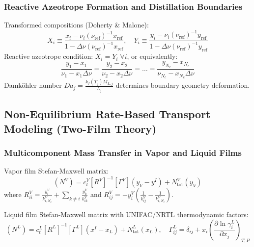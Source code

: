 \documentclass[11pt,a4paper]{article}
\begin{document}
\subsubsection{Reactive Azeotrope Formation and Distillation Boundaries}
Transformed compositions (Doherty \& Malone):
\begin{equation}
X_i \equiv \frac{x_i - \nu_i (\nu_{\text{ref}})^{-1} x_{\text{ref}}}{1 - \Delta \nu (\nu_{\text{ref}})^{-1} x_{\text{ref}}}, \quad Y_i \equiv \frac{y_i - \nu_i (\nu_{\text{ref}})^{-1} y_{\text{ref}}}{1 - \Delta \nu (\nu_{\text{ref}})^{-1} y_{\text{ref}}}
\end{equation}
Reactive azeotrope condition: $X_i = Y_i \; \forall i$, or equivalently:
\begin{equation}
\frac{y_1 - x_1}{\nu_1 - x_1 \Delta \nu} = \frac{y_2 - x_2}{\nu_2 - x_2 \Delta \nu} = \dots = \frac{y_{N_c} - x_{N_c}}{\nu_{N_c} - x_{N_c} \Delta \nu}
\end{equation}
Damk\"ohler number $Da_j = \frac{k_f(T_j) M_{L,j}}{L_j}$ determines boundary geometry deformation.

\subsection{Non-Equilibrium Rate-Based Transport Modeling (Two-Film Theory)}

\subsubsection{Multicomponent Mass Transfer in Vapor and Liquid Films}
Vapor film Stefan-Maxwell matrix:
\begin{equation}
(N^V) = c_t^V [R^V]^{-1} [\Gamma^V] (y_V - y^I) + N_{\text{tot}}^V (y_V)
\end{equation}
where $R_{ii}^V = \frac{y_i^V}{k_{i,N_c}^V} + \sum_{k \ne i} \frac{y_k^V}{k_{ik}^V}$ and $R_{ij}^V = -y_i^V \left( \frac{1}{k_{ij}^V} - \frac{1}{k_{i,N_c}^V} \right)$.

Liquid film Stefan-Maxwell matrix with UNIFAC/NRTL thermodynamic factors:
\begin{equation}
(N^L) = c_t^L [R^L]^{-1} [\Gamma^L] (x^I - x_L) + N_{\text{tot}}^L (x_L), \quad \Gamma_{ij}^L = \delta_{ij} + x_i \left( \frac{\partial \ln \gamma_i^L}{\partial x_j} \right)_{T, P}
\end{equation}
\end{document}
